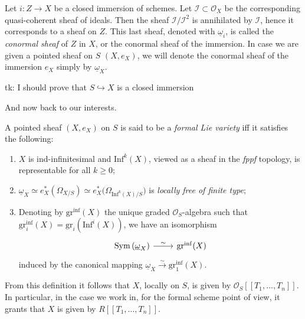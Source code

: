 \documentclass[../Main]{subfiles}
\begin{document}
\begin{defn}
	Let $i\colon Z \to X$ be a closed immersion of schemes.
	Let $\mathcal{I} \subset \mathcal{O}_X$ be the corresponding
	quasi-coherent sheaf of ideals.
	Then the sheaf $\mathcal{I}/\mathcal{I}^2$ is annihilated by $\mathcal{I}$,
	hence it corresponds to a sheaf on $Z$.
	This last sheaf, denoted with $\underline{\omega}_i$, is called the {\em conormal
	sheaf} of $Z$ in $X$, or the conormal sheaf of the immersion.
	In case we are given a pointed sheaf on $S$ $\left(X, e_X\right)$, we will denote 
	the conormal sheaf of the immersion $e_X$ simply by
	$\underline{\omega}_X$.
\end{defn}
tk: I should prove that $S \hookrightarrow X$ is a closed immersion


And now back to our interests.
\begin{defn}
	A pointed sheaf $\left(X, e_X\right)$ on $S$ is said to be
	a {\em formal Lie variety} iff it satisfies the following:
\begin{enumerate}
	\item $X$ is ind-infinitesimal and $\mathrm{Inf}^k(X)$, viewed
		as a sheaf in the {\em fppf} topology,
		is representable for all $k \geq 0$;
	\item $\underline{\omega}_X \simeq
		e_X^* \left( \Omega_{X/S} \right) \simeq
		e_X^* \big( \Omega_{\mathrm{Inf}^k(X)/S} \big)$
		is {\em locally free of finite type};
	\item Denoting by $\mathrm{gr}^{\mathrm{inf}}(X)$ the unique graded $\mathcal{O}_{ S }$-algebra
		such that $\mathrm{gr}^{\mathrm{inf}}_i(X) = \mathrm{gr}_i(\mathrm{Inf}^i(X))$,
		we have an isomorphism
		\begin{equation*}
		\begin{tikzcd}[row sep = 0ex
			,/tikz/column 1/.append style={anchor=base east}
			,/tikz/column 2/.append style={anchor=base west}]
		\mathrm{Sym}\left( \underline{\omega}_X \right) \arrow[r, "\sim", rightarrow] &
				\mathrm{gr}^{\mathrm{inf}}(X)
		\end{tikzcd}
		\end{equation*}
		induced by the canonical mapping
		$\underline{\omega}_X \xrightarrow{\sim} \mathrm{gr}_1^{\mathrm{inf}}(X)$.
\end{enumerate}
\end{defn}


\begin{rem}\label{FormalLieVarietyPowerSeries}
	From this definition it follows that $X$, locally on $S$,
	is given by $\mathcal{O}_S [\![ T_1, \ldots, T_n ]\!]$.
	In particular, in the case we work in, for the formal scheme point of view,
	it grants that $X$ is given by
	$R [\![ T_1, \ldots, T_n ]\!]$.
\end{rem}
\end{document}
